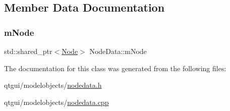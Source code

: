 \subsection{Member Data Documentation}
\mbox{\label{class_node_data_ac51bb052329667bc790179278eb035d8}} 
\subsubsection{\texorpdfstring{mNode}{mNode}}
{\footnotesize\ttfamily std\+::shared\+\_\+ptr$<$\mbox{\hyperlink{class_node}{Node}}$>$ Node\+Data\+::m\+Node}



The documentation for this class was generated from the following files\+:\begin{DoxyCompactItemize}
\item 
qtgui/modelobjects/\mbox{\hyperlink{nodedata_8h}{nodedata.\+h}}\item 
qtgui/modelobjects/\mbox{\hyperlink{nodedata_8cpp}{nodedata.\+cpp}}\end{DoxyCompactItemize}

